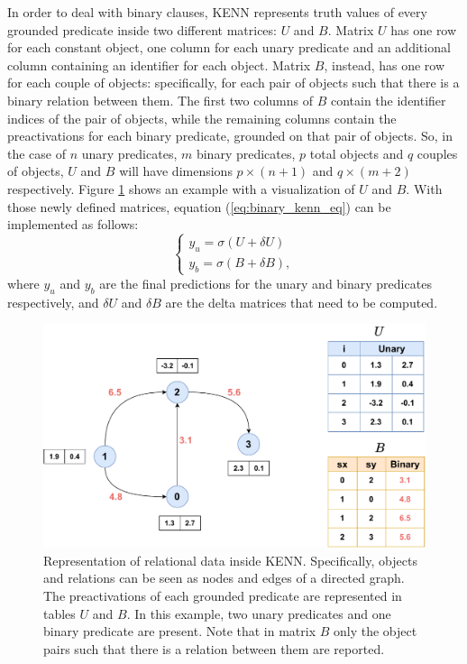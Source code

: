 In order to deal with binary clauses, KENN represents truth values of every grounded predicate inside two different matrices: $U$ and $B$. Matrix $U$ has one row for each constant object, one column for each unary predicate and an additional column containing an identifier for each object. Matrix $B$, instead, has one row for each couple of objects: specifically, for each pair of objects such that there is a binary relation between them. The first two columns of $B$ contain the identifier indices of the pair of objects, while the remaining columns contain the preactivations for each binary predicate, grounded on that pair of objects. So, in the case of $n$ unary predicates, $m$ binary predicates, $p$ total objects and $q$ couples of objects, $U$ and $B$ will have dimensions $p \times (n+1)$ and $ q \times (m+2)$ respectively. Figure \ref{fig:KENNrelationalrepr} shows an example with a visualization of $U$ and $B$. With those newly defined matrices, equation (\ref{eq:binary_kenn_eq}) can be implemented as follows:
\begin{equation*}
\begin{cases}
y_u = \sigma(U+\delta U)\\
y_b = \sigma(B + \delta B),
\end{cases}
\end{equation*}
where $y_u$ and $y_b$ are the final predictions for the unary and binary predicates respectively, and $\delta U$ and $\delta B$ are the delta matrices that need to be computed.
 
 \begin{figure}
 	\centering
 	\includegraphics[width=0.7\linewidth]{figures/kenn_relational_representation2.pdf}
 	\caption{Representation of relational data inside KENN. Specifically, objects and relations can be seen as nodes and edges of a directed graph. The preactivations of each grounded predicate are represented in tables $U$ and $B$. In this example, two unary predicates and one binary predicate are present. Note that in matrix $B$ only the object pairs such that there is a relation between them are reported.}
 	\label{fig:KENNrelationalrepr}
 \end{figure}

